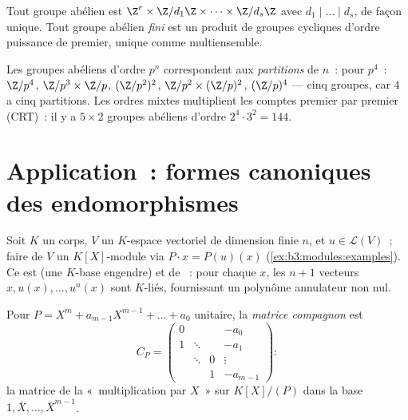 \begin{corollary}
\label{cor:b3:modules:abelian}
Tout groupe abélien  est $\Z^r \times
\Z/d_1\Z\times\dots\times\Z/d_s\Z$ avec $d_1 \mid \dots \mid
d_s$, de façon unique. Tout groupe abélien \emph{fini} est un
produit de groupes cycliques d'ordre puissance de premier, unique
comme multiensemble.
\end{corollary}

\begin{example}\label{ex:b3:modules:abelian}
Les groupes abéliens d'ordre $p^n$ correspondent aux
\emph{partitions} de $n$~: pour $p^4$~: $\Z/p^4$,
$\Z/p^3\times\Z/p$, $(\Z/p^2)^2$, $\Z/p^2 \times (\Z/p)^2$,
$(\Z/p)^4$ --- cinq groupes, car $4$ a cinq partitions. Les
ordres mixtes multiplient les comptes premier par premier
(CRT)~: il y a $5 \times 2$ groupes abéliens d'ordre $2^4 \cdot
3^2 = 144$.
\end{example}

\section{Application~: formes canoniques des endomorphismes}

Soit $K$ un corps, $V$ un $K$-espace vectoriel de dimension
finie $n$, et $u \in \mathcal L(V)$~; faire de $V$ un
$K[X]$-module via $P \cdot x = P(u)(x)$
(\cref{ex:b3:modules:examples}). Ce  est  (une
$K$-base engendre) et de ~: pour chaque $x$, les $n+1$
vecteurs $x, u(x), \dots, u^n(x)$ sont $K$-liés, fournissant un
polynôme annulateur non nul.

\begin{definition}\label{def:b3:modules:companion}
Pour $P = X^m + a_{m-1}X^{m-1} + \dots + a_0$ unitaire, la
\emph{matrice compagnon} est
\[
C_P = \begin{pmatrix}
0 & & & -a_0\\
1 & \ddots & & -a_1\\
& \ddots & 0 & \vdots\\
& & 1 & -a_{m-1}
\end{pmatrix} :
\]
la matrice de la «~multiplication par $X$~» sur $K[X]/(P)$ dans
la base $1, \bar X, \dots, \bar X^{m-1}$.
\end{definition}

